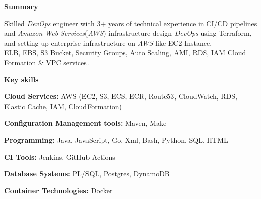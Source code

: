 \documentclass[10pt,A4]{article}
\newcommand{\cvsection}[1]
{
	\begin{center}
		\large\textcolor{sectcol}{\textbf{#1}}
	\end{center}
}
\begin{document}
\vspace{-6pt}
\cvsection{Summary}
Skilled \emph{DevOps} engineer with 3+ years of technical experience in CI/CD pipelines and \emph{Amazon Web Services}(\emph{AWS}) infrastructure design \emph{DevOps} using Terraform, and setting up enterprise infrastructure on \emph{AWS} like EC2 Instance,\\ ELB, EBS, S3 Bucket, Security Groups, Auto Scaling, AMI, RDS, IAM Cloud Formation \& VPC services.\\

\vspace{-6pt}
\cvsection{Key skills}
\vspace{-6pt}
\small\textbf{Cloud Services: } AWS (EC2, S3, ECS, ECR, Route53, CloudWatch, RDS, Elastic Cache, IAM, CloudFormation)

\textbf {Configuration Management tools: } Maven, Make

\textbf {Programming: } Java, JavaScript, Go, Xml, Bash, Python, SQL, HTML

\textbf {CI Tools:} Jenkins, GitHub Actions

\textbf {Database Systems: } PL/SQL, Postgres, DynamoDB

\textbf{Container Technologies:} Docker


\end{document}
